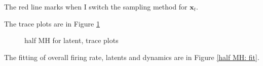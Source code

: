 \documentclass[]{article}
\begin{document}
The red line marks when I switch the sampling method for \(\mathbf{x}_t\).
 
The trace plots are in Figure \ref{half MH: trace}
\begin{figure}[h!]
	\caption{half MH for latent, trace plots}
	\label{half MH: trace}
\end{figure}

The fitting of overall firing rate, latents and dynamics are in Figure \ref{half MH: fit}.
\end{document}
